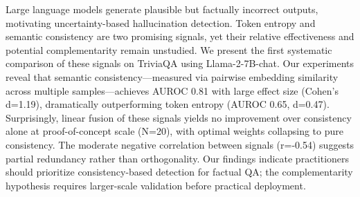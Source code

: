 Large language models generate plausible but factually incorrect outputs, motivating uncertainty-based hallucination detection. Token entropy and semantic consistency are two promising signals, yet their relative effectiveness and potential complementarity remain unstudied. We present the first systematic comparison of these signals on TriviaQA using Llama-2-7B-chat. Our experiments reveal that semantic consistency---measured via pairwise embedding similarity across multiple samples---achieves AUROC 0.81 with large effect size (Cohen's d=1.19), dramatically outperforming token entropy (AUROC 0.65, d=0.47). Surprisingly, linear fusion of these signals yields no improvement over consistency alone at proof-of-concept scale (N=20), with optimal weights collapsing to pure consistency. The moderate negative correlation between signals (r=-0.54) suggests partial redundancy rather than orthogonality. Our findings indicate practitioners should prioritize consistency-based detection for factual QA; the complementarity hypothesis requires larger-scale validation before practical deployment.
